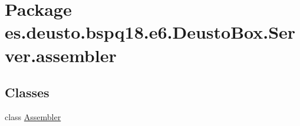 \hypertarget{namespacees_1_1deusto_1_1bspq18_1_1e6_1_1_deusto_box_1_1_server_1_1assembler}{}\section{Package es.\+deusto.\+bspq18.\+e6.\+Deusto\+Box.\+Server.\+assembler}
\label{namespacees_1_1deusto_1_1bspq18_1_1e6_1_1_deusto_box_1_1_server_1_1assembler}
\subsection*{Classes}
\begin{DoxyCompactItemize}
\item 
class \mbox{\hyperlink{classes_1_1deusto_1_1bspq18_1_1e6_1_1_deusto_box_1_1_server_1_1assembler_1_1_assembler}{Assembler}}
\end{DoxyCompactItemize}
